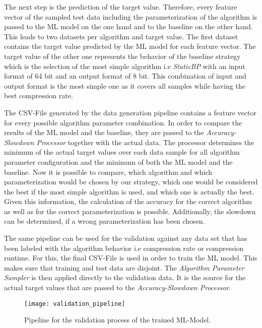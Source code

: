 The next step is the prediction of the target value. Therefore, every feature vector of the sampled test data including the parameterization of the algorithm is passed to the ML model on the one hand and to the baseline on the other hand. This leads to two datasets per algorithm and target value. The first dataset contains the target value predicted by the ML model for each feature vector. The target value of the other one represents the behavior of the baseline strategy which is the selection of the most simple algorithm i.e \emph{StaticBP} with an input format of 64 bit and an output format of 8 bit. This combination of input and output format is the most simple one as it covers all samples while having the best compression rate. 

The CSV-File generated by the data generation pipeline contains a feature vector for every possible algorithm parameter combination. In order to compare the results of the ML model and the baseline, they are passed to the \emph{Accuracy-Slowdown Processor} together with the actual data. The processor determines the minimum of the actual target values over each data sample for all algorithm parameter configuration and the minimum of both the ML model and the baseline. Now it is possible to compare, which algorithm and which parameterization would be chosen by our strategy, which one would be considered the best if the most simple algorithm is used, and which one is actually the best. Given this information, the calculation of the accuracy for the correct algorithm as well as for the correct parameterization is possible. Additionally, the slowdown can be determined, if a wrong parameterization has been chosen.

The same pipeline can be used for the validation against any data set that has been labeled with the algorithm behavior i.e compression rate or compression runtime. For this, the final CSV-File is used in order to train the ML model. This makes sure that training and test data are disjoint. The \emph{Algorithm Parameter Sampler} is then applied directly to the validation data. It is the source for the actual target values that are passed to the \emph{Accuracy-Slowdown Processor}.

\begin{figure}[h]
    \texttt{[image: validation\_pipeline]}
    \caption{Pipeline for the validation process of the trained ML-Model.}
    \label{fig:pipeline-validation}
\end{figure}

